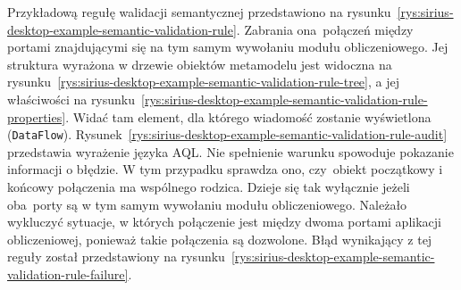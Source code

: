 Przykładową regułę walidacji semantycznej przedstawiono na
rysunku~\ref{rys:sirius-desktop-example-semantic-validation-rule}.
Zabrania ona~połączeń między portami znajdującymi się na tym samym wywołaniu
modułu obliczeniowego. Jej struktura wyrażona w drzewie obiektów metamodelu
jest widoczna na
rysunku~\ref{rys:sirius-desktop-example-semantic-validation-rule-tree}, a jej
właściwości na
rysunku~\ref{rys:sirius-desktop-example-semantic-validation-rule-properties}.
Widać tam element, dla którego wiadomość zostanie wyświetlona
(\texttt{DataFlow}).
Rysunek~\ref{rys:sirius-desktop-example-semantic-validation-rule-audit}
przedstawia wyrażenie języka \gls{AQL}. Nie spełnienie warunku spowoduje
pokazanie
informacji o błędzie. W tym przypadku sprawdza ono, czy~obiekt początkowy i
końcowy połączenia ma wspólnego rodzica. Dzieje się tak wyłącznie jeżeli
oba~porty są w
tym samym wywołaniu modułu obliczeniowego. Należało wykluczyć sytuacje, w
których połączenie jest między dwoma portami aplikacji obliczeniowej, ponieważ
takie połączenia są dozwolone. Błąd wynikający z tej reguły został
przedstawiony na
rysunku~\ref{rys:sirius-desktop-example-semantic-validation-rule-failure}.

